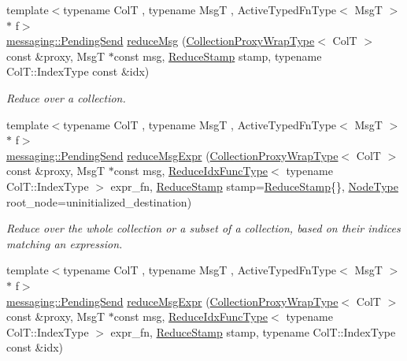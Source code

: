 \begin{DoxyCompactItemize}
{\footnotesize template$<$typename ColT , typename MsgT , Active\+Typed\+Fn\+Type$<$ Msg\+T $>$ $\ast$ f$>$ }\\\hyperlink{structvt_1_1messaging_1_1_pending_send}{messaging\+::\+Pending\+Send} \hyperlink{structvt_1_1vrt_1_1collection_1_1_collection_manager_a47fe848e9c16d55bcefcbfeefa6b5597}{reduce\+Msg} (\hyperlink{structvt_1_1vrt_1_1collection_1_1_collection_manager_a56458ed7f9bb22b631b9b3a745f42f94}{Collection\+Proxy\+Wrap\+Type}$<$ ColT $>$ const \&proxy, MsgT $\ast$const msg, \hyperlink{structvt_1_1vrt_1_1collection_1_1_collection_manager_ae8aac19e0ae07e9225142e5880eac830}{Reduce\+Stamp} stamp, typename Col\+T\+::\+Index\+Type const \&idx)
\begin{DoxyCompactList}\small\item\em Reduce over a collection. \end{DoxyCompactList}\item 
{\footnotesize template$<$typename ColT , typename MsgT , Active\+Typed\+Fn\+Type$<$ Msg\+T $>$ $\ast$ f$>$ }\\\hyperlink{structvt_1_1messaging_1_1_pending_send}{messaging\+::\+Pending\+Send} \hyperlink{structvt_1_1vrt_1_1collection_1_1_collection_manager_a784c4fa10de6571dacfb587af3c90cb1}{reduce\+Msg\+Expr} (\hyperlink{structvt_1_1vrt_1_1collection_1_1_collection_manager_a56458ed7f9bb22b631b9b3a745f42f94}{Collection\+Proxy\+Wrap\+Type}$<$ ColT $>$ const \&proxy, MsgT $\ast$const msg, \hyperlink{structvt_1_1vrt_1_1collection_1_1_collection_manager_a47a3227ae0195c15187e8dc8762f66c4}{Reduce\+Idx\+Func\+Type}$<$ typename Col\+T\+::\+Index\+Type $>$ expr\+\_\+fn, \hyperlink{structvt_1_1vrt_1_1collection_1_1_collection_manager_ae8aac19e0ae07e9225142e5880eac830}{Reduce\+Stamp} stamp=\hyperlink{structvt_1_1vrt_1_1collection_1_1_collection_manager_ae8aac19e0ae07e9225142e5880eac830}{Reduce\+Stamp}\{\}, \hyperlink{namespacevt_a866da9d0efc19c0a1ce79e9e492f47e2}{Node\+Type} root\+\_\+node=uninitialized\+\_\+destination)
\begin{DoxyCompactList}\small\item\em Reduce over the whole collection or a subset of a collection, based on their indices matching an expression. \end{DoxyCompactList}\item 
{\footnotesize template$<$typename ColT , typename MsgT , Active\+Typed\+Fn\+Type$<$ Msg\+T $>$ $\ast$ f$>$ }\\\hyperlink{structvt_1_1messaging_1_1_pending_send}{messaging\+::\+Pending\+Send} \hyperlink{structvt_1_1vrt_1_1collection_1_1_collection_manager_ae05bc119a4986a39e957c1f8e93eb079}{reduce\+Msg\+Expr} (\hyperlink{structvt_1_1vrt_1_1collection_1_1_collection_manager_a56458ed7f9bb22b631b9b3a745f42f94}{Collection\+Proxy\+Wrap\+Type}$<$ ColT $>$ const \&proxy, MsgT $\ast$const msg, \hyperlink{structvt_1_1vrt_1_1collection_1_1_collection_manager_a47a3227ae0195c15187e8dc8762f66c4}{Reduce\+Idx\+Func\+Type}$<$ typename Col\+T\+::\+Index\+Type $>$ expr\+\_\+fn, \hyperlink{structvt_1_1vrt_1_1collection_1_1_collection_manager_ae8aac19e0ae07e9225142e5880eac830}{Reduce\+Stamp} stamp, typename Col\+T\+::\+Index\+Type const \&idx)

\end{DoxyCompactItemize}
